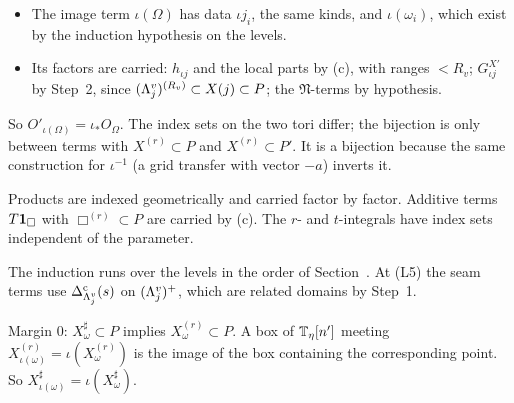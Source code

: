 \begin{detail}
\begin{step}
\begin{itemize}
\item The image term $\iota(\Omega)$ has data $\iota j_i$, the same kinds, and $\iota(\omega_i)$, which exist by the induction hypothesis on the levels.
\item Its factors are carried: $h_{\iota j}$ and the local parts by (c), with ranges $<R_v$; $G^{X'}_{\iota j}$ by Step~2, since $(\Lambda^v_j)^{(R_v)}\subset X(j)\subset P$; the $\mathfrak N$-terms by hypothesis.
\end{itemize}
So $O'_{\iota(\Omega)}=\iota_*O_\Omega$. The index sets on the two tori differ; the bijection is only between terms with $X^{(r)}\subset P$ and $X^{(r)}\subset P'$. It is a bijection because the same construction for $\iota^{-1}$ (a grid transfer with vector $-a$) inverts it.
\end{step}
\begin{step}
Products are indexed geometrically and carried factor by factor. Additive terms $T\mathbf 1_\Box$ with $\Box^{(r)}\subset P$ are carried by (c). The $r$- and $t$-integrals have index sets independent of the parameter.

The induction runs over the levels in the order of Section~. At (L5) the seam terms use $\Delta^{\rm c}_{\Lambda^v_j}(s)$ on $(\Lambda^v_j)^+$, which are related domains by Step~1.

Margin $0$: $X^\sharp_\omega\subset P$ implies $X^{(r)}_\omega\subset P$. A box of $\mathbb T_\eta[n']$ meeting $X^{(r)}_{\iota(\omega)}=\iota(X^{(r)}_\omega)$ is the image of the box containing the corresponding point. So $X^\sharp_{\iota(\omega)}=\iota(X^\sharp_\omega)$.


\end{step}
\end{detail}
